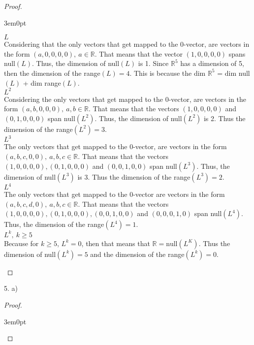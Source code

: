 \documentclass[11pt]{article}
\newcommand{\R}{\mathbb{R}}
\newenvironment{myproof}
{\begin{proof} \begin{adjustwidth}{3em}{0pt}$ $\par\nobreak\ignorespaces}
{\end{adjustwidth} \end{proof}}
\begin{document}
\begin{flushleft}
\begin{myproof}
$L$ \\
Considering that the only vectors that get mapped to the 0-vector, are vectors in the form $(a,0,0,0,0) , \ a \in \R$. That means that the vector $(1,0,0,0,0)$ spans null$(L)$. Thus, the dimension of null$(L)$ is 1. Since $\R^5$ has a dimension of 5, then the dimension of the range$(L) = 4$. This is because the dim $\R^5$ = dim null$(L)$ + dim range$(L)$. \\
\bigskip
$L^2$ \\
Considering the only vectors that get mapped to the 0-vector, are vectors in the form $(a,b,0,0,0), \ a,b \in \R$. That means that the vectors $(1,0,0,0,0)$ and $(0,1,0,0,0)$ span null$(L^2)$. Thus, the dimension of null$(L^2)$ is 2. Thus the dimension of the range$(L^2) = 3$. \\
\bigskip
$L^3$ \\
The only vectors that get mapped to the 0-vector, are vectors in the form $(a,b,c,0,0), \ a,b,c \in \R$. That means that the vectors $(1,0,0,0,0), (0,1,0,0,0)$ and $(0,0,1,0,0)$ span null$(L^3)$. Thus, the dimension of null$(L^3)$ is 3. Thus the dimension of the range$(L^3) = 2$. \\
\bigskip
$L^4$ \\
The only vectors that get mapped to the 0-vector are vectors in the form $(a,b,c,d,0), \ a,b,c \in \R$.  That means that the vectors $(1,0,0,0,0), (0,1,0,0,0), (0,0,1,0,0)$ and $(0,0,0,1,0)$ span null$(L^4)$. Thus, the dimension of the range$(L^4) = 1$. \\
\bigskip
$L^k, \ k \geq 5$ \\
Because for $k \geq 5$, $L^k = 0$, then that means that $\R = \text{null}(L^K)$. Thus the dimension of null$(L^k) = 5$ and the dimension of the range$(L^k) = 0$.

\end{myproof}

\newpage

5. a)

\begin{myproof}



\end{myproof}
\end{flushleft}
\end{document}
